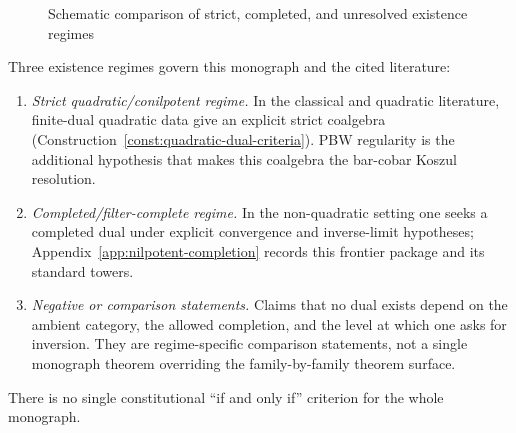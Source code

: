 \begin{figure}[H]
\centering
{}
\caption{Schematic comparison of strict, completed, and unresolved
existence regimes}
\label{fig:decision-tree-existence}
\end{figure}

\begin{remark}
\label{rem:existence-summary}
Three existence regimes govern this monograph and the cited literature:
\begin{enumerate}
\item \emph{Strict quadratic/conilpotent regime.} In the classical
 and quadratic literature, finite-dual quadratic data give an explicit
 strict coalgebra
 \textup{(}Construction~\ref{const:quadratic-dual-criteria}\textup{)}.
 PBW regularity is the additional hypothesis that makes this coalgebra
 the bar-cobar Koszul resolution.
\item \emph{Completed/filter-complete regime.} In the non-quadratic
 setting one seeks a completed dual under explicit convergence and
 inverse-limit hypotheses; Appendix~\ref{app:nilpotent-completion}
 records this frontier package and its standard towers.
\item \emph{Negative or comparison statements.} Claims that no dual
 exists depend on the ambient category, the allowed completion, and the
 level at which one asks for inversion. They are regime-specific
 comparison statements, not a single monograph theorem overriding the
 family-by-family theorem surface.
\end{enumerate}
There is no single constitutional ``if and only if'' criterion for the
whole monograph.
\end{remark}

